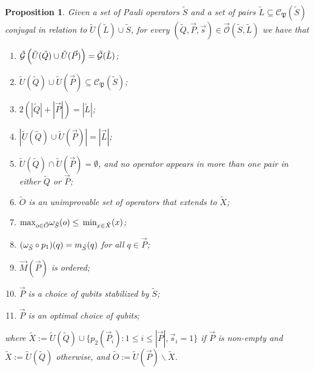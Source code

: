 \documentclass[twocolumn,showpacs,preprintnumbers,amsmath,amssymb,nofootinbib,pra,floatfix]{revtex4-1}
\newtheorem{proposition}{Proposition}
\newcommand{\lst}{\vec}
\newcommand{\set}{\tilde}
\newcommand{\genfun}{\tilde{\mathcal{G}}}
\newcommand{\pauligroup}{\mathfrak{P}}
\newcommand{\centralizer}{\mathcal{C}}
\newcommand{\unpack}{\set U}
\newcommand{\optimizer}{\lst{\mathcal{O}}}
\begin{document}
\begin{proposition}
\label{proposition:properties of the algorithm}
Given a set of Pauli operators $\set S$ and a set of pairs $\set L\subseteq\centralizer_\pauligroup(\set S)$ conjugal in relation to $\set U(\set L)\cup\set S$, for every $(\set Q,\lst P,\lst s)\in\optimizer(\set S,\set L)$ we have that
\begin{enumerate}
\item $\genfun\paren{\set U(\set Q)\cup\set U(\lst P)}=\genfun(\set L)$;
\item $\set U(\set Q)\cup\set U(\lst P)\subseteq\centralizer_\pauligroup(\set S)$;
\item $2(|\set Q|+|\lst P|)=|\set L|$;
\item $|\set U(\set Q)\cup\set U(\lst P)|=|\lst L|$;
\item $\set U(\set Q)\cap\set U(\lst P)=\emptyset$, and no operator appears in more than one pair in either $\set Q$ or $\lst P$;
\item $\set O$ is an unimprovable set of operators that extends to $\set X$;
\item $\max_{o\in\set O}\om_{\set S}(o)\le\min_{x\in\set X}(x)$;
\item $(\om_{\set S}\circ p_1)(q)=m_{\set S}(q)$ for all $q\in\lst P$;
\item $\lst M(\lst P)$ is ordered;
\item $\lst P$ is a choice of qubits stabilized by $\set S$;
\item $\lst P$ is an optimal choice of qubits;
\end{enumerate}
where $\set X := \unpack(\set Q)\cup\{p_2(\lst P_i):1 \le i \le |\lst P|, \lst s_i=1\}$ if $\lst P$ is non-empty and $\set X := \unpack(\set Q)$ otherwise, and $\set O:=\unpack(\lst P)\backslash\set X$.
\end{proposition}
\end{document}
